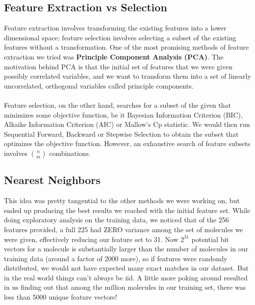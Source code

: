 \documentclass[letterpaper]{article}
\begin{document}




\subsection{Feature Extraction vs Selection}

Feature extraction involves transforming the existing features into a lower dimensional space; feature selection involves selecting a subset of the existing features without a transformation. One of the most promising methods of feature extraction we tried was {\bf Principle Component Analysis (PCA)}. The motivation behind PCA is that the initial set of features that we were given possibly correlated variables, and we want to transform them into a set of linearly uncorrelated, orthogonal variables called principle components. \\
\\
Feature selection, on the other hand, searches for a subset of the given that minimizes some objective function, be it Bayesian Information Criterion (BIC), Alkaike Information Criterion (AIC) or Mallow's Cp statistic. We would then run Sequential Forward, Backward or Stepwise Selection to obtain the subset that optimizes the objective function. However, an exhaustive search of feature subsets involves $\binom{n}{m}$ combinations.



\subsection{Nearest Neighbors}
This idea was pretty tangential to the other methods we were working on, but ended up producing the best results we reached with the initial feature set. While doing exploratory analysis on the training data, we noticed that of the 256 features provided, a full 225 had ZERO variance among the set of molecules we were given, effectively reducing our feature set to 31. Now $2^{31}$ potential bit vectors for a molecule is substantially larger than the number of molecules in our training data (around a factor of 2000 more), so if features were randomly distributed, we would not have expected many exact matches in our dataset. But in the real world things can't always be iid. A little more poking around resulted in us finding out that among the million molecules in our training set, there was less than 5000 unique feature vectors! 
\end{document}
